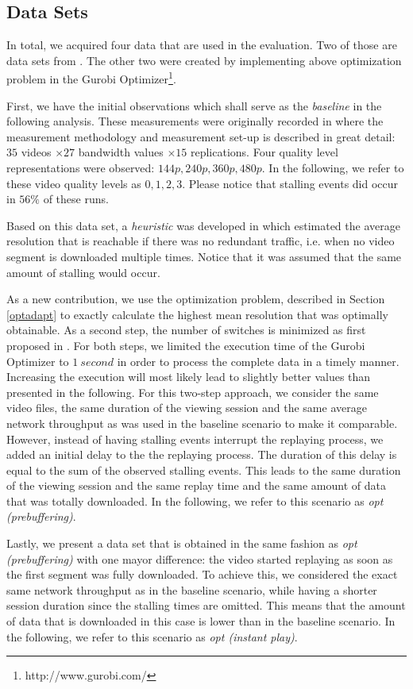 
\subsection{Data Sets}

In total, we acquired four data that are used in the evaluation. Two of those are data sets from \cite{sieber16sacrificing}. The other two were created by implementing above optimization problem in the Gurobi Optimizer\footnote{http://www.gurobi.com/}.

First, we have the initial observations which shall serve as the \textit{baseline} in the following analysis. These measurements were originally recorded in \cite{sieber16sacrificing} where the measurement methodology and measurement set-up is described in great detail: $35$ videos $\times 27$ bandwidth values $\times 15$ replications. Four quality level representations were observed: $144p, 240p, 360p, 480p$. In the following, we refer to these video quality levels as $0,1,2,3$. Please notice that stalling events did occur in $56\%$ of these runs.

Based on this data set, a \textit{heuristic} was developed in \cite{sieber16sacrificing} which estimated the average resolution that is reachable if there was no redundant traffic, i.e. when no video segment is downloaded multiple times. Notice that it was assumed that the same amount of stalling would occur.

As a new contribution, we use the optimization problem, described in Section \ref{optadapt} to exactly calculate the highest mean resolution that was optimally obtainable. As a second step, the number of switches is minimized as first proposed in \cite{miller2013optimal}. For both steps, we limited the execution time of the Gurobi Optimizer to $\SI{1}{second}$ in order to process the complete data in a timely manner. Increasing the execution will most likely lead to slightly better values than presented in the following. For this two-step approach, we consider the same video files, the same duration of the viewing session and the same average network throughput as was used in the baseline scenario to make it comparable. However, instead of having stalling events interrupt the replaying process, we added an initial delay to the the replaying process. The duration of this delay is equal to the sum of the observed stalling events. This leads to the same duration of the viewing session and the same replay time and the same amount of data that was totally downloaded. In the following, we refer to this scenario as \textit{opt (prebuffering)}.

Lastly, we present a data set that is obtained in the same fashion as \textit{opt (prebuffering)} with one mayor difference: the video started replaying as soon as the first segment was fully downloaded. To achieve this, we considered the exact same network throughput as in the baseline scenario, while having a shorter session duration since the stalling times are omitted. This means that the amount of data that is downloaded in this case is lower than in the baseline scenario. In the following, we refer to this scenario as \textit{opt (instant play)}.
